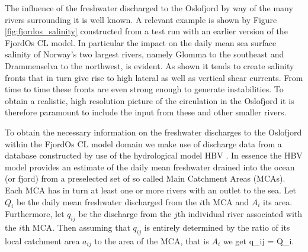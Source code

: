 The influence of the freshwater discharged to the Oslofjord by way of the many rivers surrounding it is well known. A relevant example is shown by Figure \ref{fig:fjordos_salinity} constructed from a test run with an earlier version of the FjordOs CL model. In particular the impact on the daily mean sea surface salinity of Norway's two largest rivers, namely Glomma to the southeast and Drammenselva to the northwest, is evident. As shown it tends to create salinity fronts that in turn give rise to high lateral as well as vertical shear currents. From time to time these fronts are even strong enough to generate instabilities. To obtain a realistic, high resolution picture of the circulation in the Oslofjord it is therefore paramount to include the input from these and other smaller rivers.

 

To obtain the necessary information on the freshwater discharges to the Oslofjord within the FjordOs CL model domain we make use of discharge data from a database constructed by use of the hydrological model HBV \citep{beldr:etal:2003}. In essence the HBV model provides an estimate of the daily mean freshwater drained into the ocean (or fjord) from a preselected set of so called Main Catchment Areas (MCAs). Each MCA has in turn at least one or more rivers with an outlet to the sea. Let $Q_i$ be the daily mean freshwater discharged from the $i$th MCA and $A_i$ its area. Furthermore, let $q_{ij}$ be the discharge from the $j$th individual river associated with the $i$th MCA. Then assuming that $q_{ij}$ is entirely determined by the ratio of its local catchment area $a_{ij}$ to the area of the MCA, that is $A_i$ we get
\be
 \label{eq:riv02}
  q_{ij} =  Q_i.
\ee

